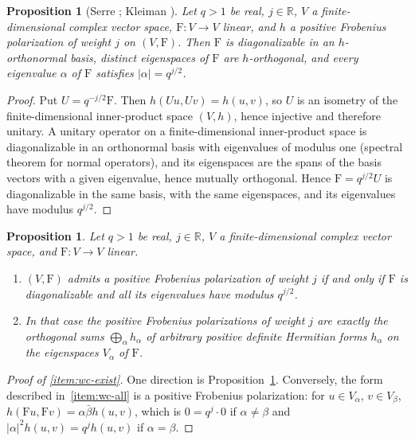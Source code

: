 \documentclass[11pt]{amsart}
\theoremstyle{plain}
\newtheorem{proposition}[theorem]{Proposition}
\theoremstyle{definition}
\theoremstyle{remark}
\numberwithin{equation}{section}
\newcommand{\R}{\mathbb{R}}
\begin{document}
\begin{proposition}[{Serre \cite[p.~393]{Serre1960Analogues}; Kleiman
\cite[Lemma~4.6, p.~385]{Kleiman1968Cycles}}]\label{prop:weil-linear}
Let $q>1$ be real, $j\in\R$, $V$ a finite-dimensional complex vector
space, $\mathrm{F}:V\to V$ linear, and $h$ a positive Frobenius
polarization of weight $j$ on $(V,\mathrm{F})$. Then $\mathrm{F}$ is
diagonalizable in an $h$-orthonormal basis, distinct eigenspaces of
$\mathrm{F}$ are $h$-orthogonal, and every eigenvalue $\alpha$ of
$\mathrm{F}$ satisfies $|\alpha|=q^{j/2}$.
\end{proposition}

\begin{proof}
Put $U=q^{-j/2}\mathrm{F}$. Then $h(Uu,Uv)=h(u,v)$, so $U$ is an
isometry of the finite-dimensional inner-product space $(V,h)$, hence
injective and therefore unitary. A unitary operator on a
finite-dimensional inner-product space is diagonalizable in an
orthonormal basis with eigenvalues of modulus one (spectral theorem for
normal operators), and its eigenspaces are the spans of the basis
vectors with a given eigenvalue, hence mutually orthogonal. Hence
$\mathrm{F}=q^{j/2}U$ is diagonalizable in the same basis, with the
same eigenspaces, and its eigenvalues have modulus $q^{j/2}$.
\end{proof}

\begin{proposition}\label{prop:weil-converse}
Let $q>1$ be real, $j\in\R$, $V$ a finite-dimensional complex vector
space, and $\mathrm{F}:V\to V$ linear.
\begin{enumerate}[label=(\roman*)]
\item\label{item:wc-exist} $(V,\mathrm{F})$ admits a positive Frobenius
  polarization of weight $j$ if and only if $\mathrm{F}$ is
  diagonalizable and all its eigenvalues have modulus $q^{j/2}$.
\item\label{item:wc-all} In that case the positive Frobenius
  polarizations of weight $j$ are exactly the orthogonal sums
  $\bigoplus_\alpha h_\alpha$ of arbitrary positive definite Hermitian
  forms $h_\alpha$ on the eigenspaces $V_\alpha$ of $\mathrm{F}$.
\end{enumerate}
\end{proposition}

\begin{proof}[Proof of \ref{item:wc-exist}]
One direction is Proposition~\ref{prop:weil-linear}. Conversely, the
form described in~\ref{item:wc-all} is a positive Frobenius
polarization: for $u\in V_\alpha$, $v\in V_\beta$,
$h(\mathrm{F}u,\mathrm{F}v)=\alpha\bar\beta h(u,v)$, which is $0=q^j\cdot
0$ if $\alpha\ne\beta$ and $|\alpha|^2h(u,v)=q^jh(u,v)$ if
$\alpha=\beta$.
\end{proof}
\end{document}
